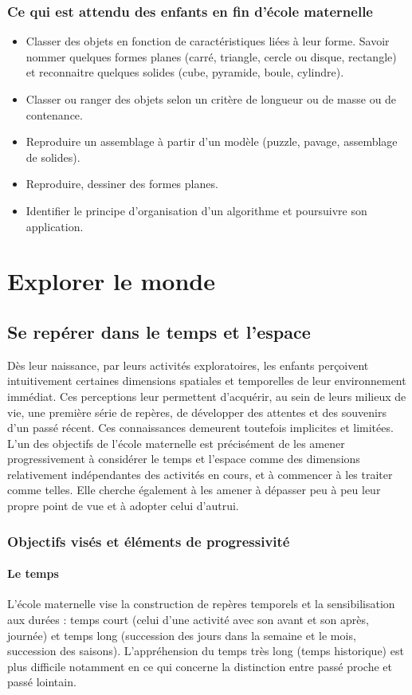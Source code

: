 \subsection{Ce qui est attendu des enfants en fin d’école maternelle}
\begin{itemize}
\item Classer des objets en fonction de caractéristiques liées à leur forme. Savoir nommer quelques formes planes (carré, triangle, cercle ou disque, rectangle) et reconnaitre quelques solides (cube, pyramide, boule, cylindre).
\item Classer ou ranger des objets selon un critère de longueur ou de masse ou de contenance.
\item Reproduire un assemblage à partir d’un modèle (puzzle, pavage, assemblage de solides).
\item Reproduire, dessiner des formes planes.
\item Identifier le principe d’organisation d’un algorithme et poursuivre son application. 
\end{itemize}

\chapter{Explorer le monde}
\section{Se repérer dans le temps et l’espace}
Dès leur naissance, par leurs activités exploratoires, les enfants perçoivent intuitivement certaines dimensions spatiales et temporelles de leur environnement immédiat. Ces perceptions leur permettent d’acquérir, au sein de leurs milieux de vie, une première série de repères, de développer des attentes et des souvenirs d’un passé récent. Ces connaissances demeurent toutefois implicites et limitées. L’un des objectifs de l’école maternelle est précisément de les amener progressivement à considérer le temps et l’espace comme des dimensions relativement indépendantes des activités en cours, et à commencer à les traiter comme telles. Elle cherche également à les amener à dépasser peu à peu leur propre point de vue et à adopter celui d’autrui.

\subsection{Objectifs visés et éléments de progressivité}
\subsubsection{Le temps}
L’école maternelle vise la construction de repères temporels et la sensibilisation aux durées : temps court (celui d’une activité avec son avant et son après, journée) et temps long (succession des jours dans la semaine et le mois, succession des saisons). L’appréhension du temps très long (temps historique) est plus difficile notamment en ce qui concerne la distinction entre passé proche et passé lointain.

